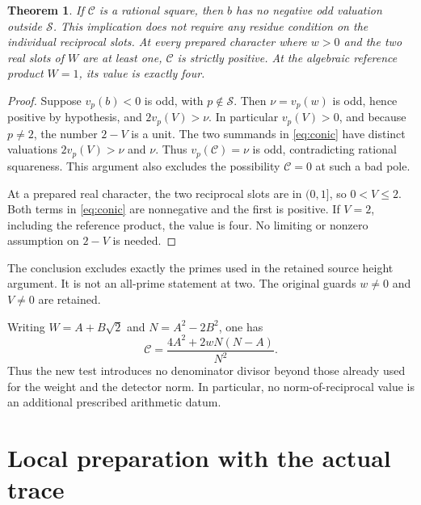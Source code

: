 \documentclass[11pt,a4paper]{article}
\newtheorem{theorem}{Theorem}[section]
\begin{document}
\begin{theorem}\label{thm:pole}
If \(\mathcal C\) is a rational square, then \(b\) has no negative
odd valuation outside \(\mathcal S\). This implication does not
require any residue condition on the individual reciprocal slots.
At every prepared character where \(w>0\) and the two real slots of
\(W\) are at least one, \(\mathcal C\) is strictly positive.
At the algebraic reference product \(W=1\), its value is exactly four.
\end{theorem}
\begin{proof}
Suppose \(v_p(b)<0\) is odd, with \(p\notin\mathcal S\).
Then \(\nu=v_p(w)\) is odd, hence positive by hypothesis, and
\(2v_p(V)>\nu\). In particular \(v_p(V)>0\), and because
\(p\ne2\), the number \(2-V\) is a unit. The two summands in
\eqref{eq:conic} have distinct valuations \(2v_p(V)>\nu\) and
\(\nu\). Thus \(v_p(\mathcal C)=\nu\) is odd, contradicting
rational squareness. This argument also excludes the possibility
\(\mathcal C=0\) at such a bad pole.

At a prepared real character, the two reciprocal slots are in
\((0,1]\), so \(0<V\le2\). Both terms in \eqref{eq:conic} are
nonnegative and the first is positive. If \(V=2\), including the
reference product, the value is four. No limiting or nonzero
assumption on \(2-V\) is needed.
\end{proof}

The conclusion excludes exactly the primes used in the retained source
height argument. It is not an all-prime statement at two. The original
guards \(w\ne0\) and \(V\ne0\) are retained.

Writing \(W=A+B\sqrt2\) and \(N=A^2-2B^2\), one has
\begin{equation}\label{eq:cleared}
 \mathcal C=\frac{4A^2+2wN(N-A)}{N^2}.
\end{equation}
Thus the new test introduces no denominator divisor beyond those
already used for the weight and the detector norm. In particular, no
norm-of-reciprocal value is an additional prescribed arithmetic datum.

\section{Local preparation with the actual trace}
\end{document}
